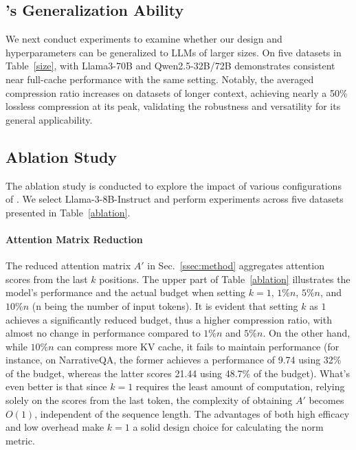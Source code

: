 
\subsection{\method's Generalization Ability}

We next conduct experiments to examine whether our design and hyperparameters can be generalized to LLMs of larger sizes.
On five datasets in Table~\ref{size}, \method with Llama3-70B and Qwen2.5-32B/72B demonstrates consistent near full-cache performance with the same \method setting.
Notably, the averaged compression ratio increases on datasets of longer context, achieving nearly a 50\% lossless compression at its peak, validating the robustness and versatility for its general applicability.

\subsection{Ablation Study}
\label{ssec:ablation}

The ablation study is conducted to explore the impact of various configurations of \method. We select Llama-3-8B-Instruct and perform experiments across five datasets presented in Table~\ref{ablation}.

\paragraph{Attention Matrix Reduction}
The reduced attention matrix $A'$ in Sec.~\ref{ssec:method} aggregates attention scores from the last $k$ positions. The upper part of Table~\ref{ablation} illustrates the model's performance and the actual budget when setting $k=1$, $1\%n$, $5\%n$, and $10\%n$ (n being the number of input tokens). It is evident that setting $k$ as $1$ achieves a significantly reduced budget, thus a higher compression ratio, with almost no change in performance compared to $1\%n$ and $5\%n$. On the other hand, while $10\%n$ can compress more KV cache, it fails to maintain performance (for instance, on NarrativeQA, the former achieves a performance of 9.74 using 32\% of the budget, whereas the latter scores 21.44 using 48.7\% of the budget). 
What's even better is that since $k=1$ requires the least amount of computation, relying solely on the scores from the last token, the complexity of obtaining $A'$ becomes $O(1)$, independent of the sequence length. The advantages of both high efficacy and low overhead make $k=1$ a solid design choice for calculating the norm metric.

